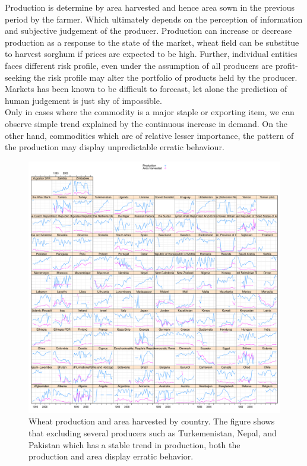 \documentclass[nojss]{jss}\usepackage[]{graphicx}\usepackage[]{color}
\makeatletter
\def\maxwidth{ %
  \ifdim\Gin@nat@width>\linewidth
    \linewidth
  \else
    \Gin@nat@width
  \fi
}
\newenvironment{knitrout}{}{} %
\makeatother
\begin{document}
Production is determine by area harvested and hence area sown in the
previous period by the farmer. Which ultimately depends on the
perception of information and subjective judgement of the
producer. Production can increase or decrease production as a response
to the state of the market, wheat field can be substitue to harvest
sorghum if prices are expected to be high. Further, individual
entities faces different risk profile, even under the assumption of
all producers are profit-seeking the risk profile may alter the
portfolio of products held by the producer. Markets has been known to
be difficult to forecast, let alone the prediction of human judgement
is just shy of impossible.\\

Only in cases where the commodity is a major staple or exporting item,
we can observe simple trend explained by the continuous increase in
demand. On the other hand, commodities which are of relative lesser
importance, the pattern of the production may display unpredictable
erratic behaviour.\\



\begin{knitrout}
\color{fgcolor}\begin{figure}[!ht]


{\centering \includegraphics[width=\maxwidth]{figure/wheat-production-area-explore} 

}

\caption[Wheat production and area harvested by country]{Wheat production and area harvested by country. The figure shows that excluding several producers such as Turkemenistan, Nepal, and Pakistan which has a stable trend in production, both the production and area display erratic behavior.\label{fig:wheat-production-area-explore}}
\end{figure}


\end{knitrout}
\end{document}
